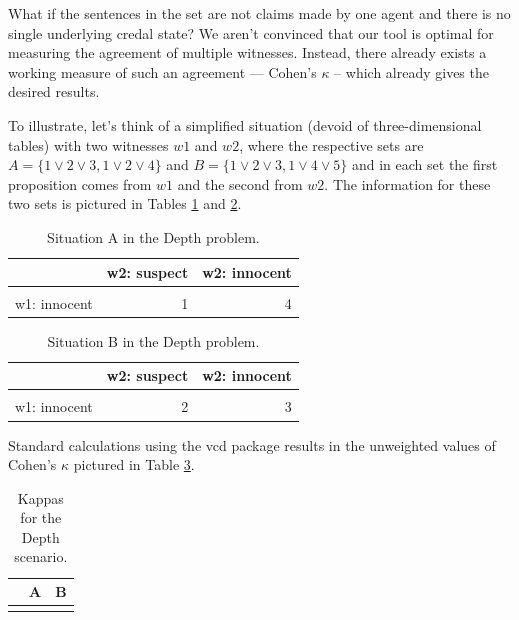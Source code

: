 \documentclass[
  10pt,
]{scrartcl}
\begin{document}
What if the sentences in the set are not claims made by one agent and there is no single underlying credal state? We aren't convinced that our tool is optimal for measuring the agreement of multiple witnesses. Instead, there already exists a working measure of such an agreement --- Cohen's \(\kappa\) -- which already gives the desired results.

To illustrate, let's think of a simplified situation (devoid of three-dimensional tables) with two witnesses \(w1\) and \(w2\), where the respective sets are
\(A = \{1 \vee 2 \vee 3, 1\vee 2 \vee 4\}\) and
\(B = \{1 \vee 2 \vee 3, 1\vee 4 \vee 5\}\) and in each set the first proposition comes from \(w1\) and the second from \(w2\). The information for these two sets is pictured in Tables \ref{tab:AkableTab} and \ref{tab:BkableTab}.

\begin{table}[H]

\caption{\label{tab:AkableTab}Situation A in the Depth problem.}
\centering
\begin{tabular}[t]{lrr}
\toprule
  & w2: suspect & w2: innocent\\
\midrule
\cellcolor{gray!6}{w1:suspect} & \cellcolor{gray!6}{2} & \cellcolor{gray!6}{1}\\
w1: innocent & 1 & 4\\
\bottomrule
\end{tabular}
\end{table}

\begin{table}[H]

\caption{\label{tab:BkableTab}Situation B in the Depth problem.}
\centering
\begin{tabular}[t]{lrr}
\toprule
  & w2: suspect & w2: innocent\\
\midrule
\cellcolor{gray!6}{w1: suspect} & \cellcolor{gray!6}{1} & \cellcolor{gray!6}{2}\\
w1: innocent & 2 & 3\\
\bottomrule
\end{tabular}
\end{table}

\noindent Standard calculations using the \textsf{vcd} package results in the unweighted values of Cohen's \(\kappa\) pictured in Table \ref{tab:kappas2table}.

\begin{table}[H]

\caption{\label{tab:kappas2table}Kappas for the Depth scenario.}
\centering
\begin{tabular}[t]{lrr}
\toprule
  & A & B\\
\midrule
\cellcolor{gray!6}{value} & \cellcolor{gray!6}{0.467} & \cellcolor{gray!6}{-0.067}\\
\bottomrule
\end{tabular}
\end{table}
\end{document}
